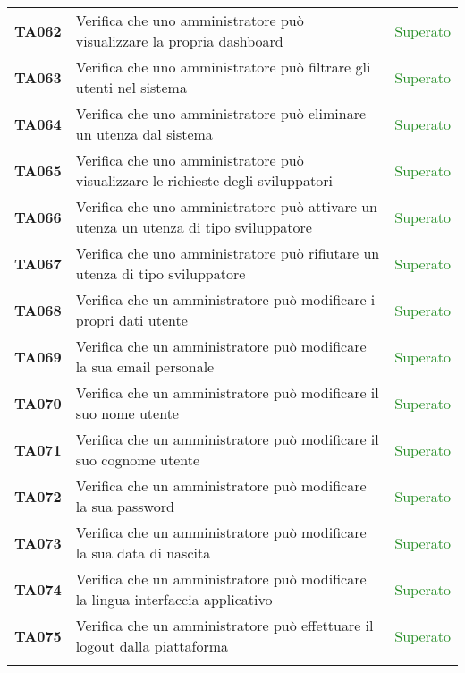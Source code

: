 \begin{tabularx}{\textwidth}{cXc}
    \textbf{TA062} & Verifica che uno amministratore può visualizzare la propria dashboard & \textcolor{ForestGreen}{Superato} \\
	\textbf{TA063} & Verifica che uno amministratore può filtrare gli utenti nel sistema & \textcolor{ForestGreen}{Superato} \\
	\textbf{TA064} & Verifica che uno amministratore può eliminare un utenza dal sistema & \textcolor{ForestGreen}{Superato} \\
	\textbf{TA065} & Verifica che uno amministratore può visualizzare le richieste degli sviluppatori & \textcolor{ForestGreen}{Superato} \\
	\textbf{TA066} & Verifica che uno amministratore può attivare un utenza un utenza di tipo sviluppatore & \textcolor{ForestGreen}{Superato} \\
	\textbf{TA067} & Verifica che uno amministratore può rifiutare un utenza di tipo sviluppatore & \textcolor{ForestGreen}{Superato} \\
	\textbf{TA068} & Verifica che un amministratore può modificare i propri dati utente & \textcolor{ForestGreen}{Superato} \\
	\textbf{TA069} & Verifica che un amministratore può modificare la sua email personale & \textcolor{ForestGreen}{Superato} \\
	\textbf{TA070} & Verifica che un amministratore può modificare il suo nome utente & \textcolor{ForestGreen}{Superato} \\
	\textbf{TA071} & Verifica che un amministratore può modificare il suo cognome utente & \textcolor{ForestGreen}{Superato} \\
	\textbf{TA072} & Verifica che un amministratore può modificare la sua password & \textcolor{ForestGreen}{Superato} \\
	\textbf{TA073} & Verifica che un amministratore può modificare la sua data di nascita & \textcolor{ForestGreen}{Superato} \\
	\textbf{TA074} & Verifica che un amministratore può modificare la lingua interfaccia applicativo & \textcolor{ForestGreen}{Superato} \\
	\textbf{TA075} & Verifica che un amministratore può effettuare il logout dalla piattaforma & \textcolor{ForestGreen}{Superato} \\
	
	
	\rowcolor{white}
	\caption{Test di Approvazione}
	\label{tab:tabellatestunità}
\end{tabularx}


